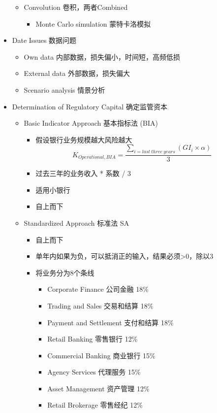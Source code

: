 \documentclass[a4paper,6pt,twoside,openany]{article}
\begin{document}
\begin{itemize}
\begin{itemize}
  \item Convolution 卷积，两者Combined
    \begin{itemize}
    \item Monte Carlo simulation 蒙特卡洛模拟
    \end{itemize}
  \end{itemize}
\item Date Issues 数据问题
  \begin{itemize}
  \item Own data 内部数据，损失偏小，时间短，高频低损
  \item External data 外部数据，损失偏大
  \item Scenario analysis 情景分析
  \end{itemize}
\item Determination of Regulatory Capital 确定监管资本
  \begin{itemize}
  \item Basic Indicator Approach 基本指标法 (BIA)
    \begin{itemize}
    \item 假设银行业务规模越大风险越大
      $$K_{Operational,BIA} = \frac{\sum_{i = last\ three\ years}(GI_i \times \alpha)}{3}$$
    \item 过去三年的业务收入 * 系数 / 3
    \item 适用小银行
    \item 自上而下
    \end{itemize}
  \item Standardized Approach 标准法 SA
    \begin{itemize}
    \item 自上而下
    \item 单年内如果为负，可以抵消正的输入，结果必须>0，除以3
    \item 将业务分为8个条线
      \begin{itemize}
      \item Corporate Finance 公司金融 18\%
      \item Trading and Sales 交易和结算 18\%
      \item Payment and Settlement 支付和结算 18\%
      \item Retail Banking 零售银行 12\%
      \item Commercial Banking 商业银行 15\%
      \item Agency Services 代理服务 15\%
      \item Asset Management 资产管理 12\%
      \item Retail Brokerage 零售经纪 12\%

\end{itemize}
\end{itemize}
\end{itemize}
\end{itemize}
\end{document}
